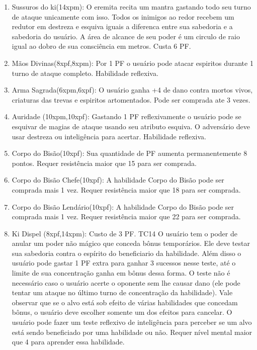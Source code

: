 \begin{enumerate}
	\item Sussuros do ki(14xpm): O eremita recita um mantra gastando todo seu turno de ataque unicamente com isso. Todos os inimigos ao redor recebem um redutor em destreza e esquiva iguais a diferenca entre sua sabedoria e a sabedoria do usuário. A área de alcance de seu poder é um circulo de raio igual ao dobro de sua consciência em metros. Custa 6 PF.

	\item Mãos Divinas(8xpf,8xpm): Por 1 PF o usuário pode atacar espiritos durante 1 turno de ataque completo. Habilidade reflexiva.

\item Arma Sagrada(6xpm,6xpf): O usuário ganha +4 de dano contra mortos vivos, criaturas das trevas e espiritos artomentados. Pode ser comprada ate 3 vezes.

		\item Auridade (10xpm,10xpf): Gastando 1 PF reflexivamente o usuário pode se esquivar de magias de ataque usando seu atributo esquiva. O adversário deve usar destreza ou inteligência para acertar. Habilidade reflexiva.


	\item Corpo do Bisão(10xpf): Sua quantidade de PF aumenta permanentemente 8 pontos. Requer resistência maior que 15 para ser comprada. 
	
	\item Corpo do Bisão Chefe(10xpf): A habilidade Corpo do Bisão pode ser comprada mais 1 vez. Requer resistência maior que 18 para ser comprada.

	\item Corpo do Bisão Lendário(10xpf): A habilidade Corpo do Bisão pode ser comprada mais 1 vez. Requer resistência maior que 22 para ser comprada.

  \item Ki Dispel (8xpf,14xpm): Custo de 3 PF. TC14\newline
O usuário tem o poder de anular um poder não mágico que conceda bônus temporários. Ele deve testar sua sabedoria contra o espírito do beneficiario da habilidade. Além disso o usuário pode gastar 1 PF extra para ganhar 3 sucessos nesse teste, até o limite de sua concentração ganha em bônus dessa forma. O teste não é necessário caso o usuário acerte o oponente sem lhe causar dano (ele pode tentar um ataque no último turno de concentração da habilidade). Vale observar que se o alvo está sob efeito de várias habilidades que concedam bônus, o usuário deve escolher somente um dos efeitos para cancelar. O usuário pode fazer um teste reflexivo de inteligência para perceber se um alvo está sendo beneficiado por uma habilidade ou não. Requer nível mental maior que 4 para aprender essa habilidade.


\end{enumerate}
